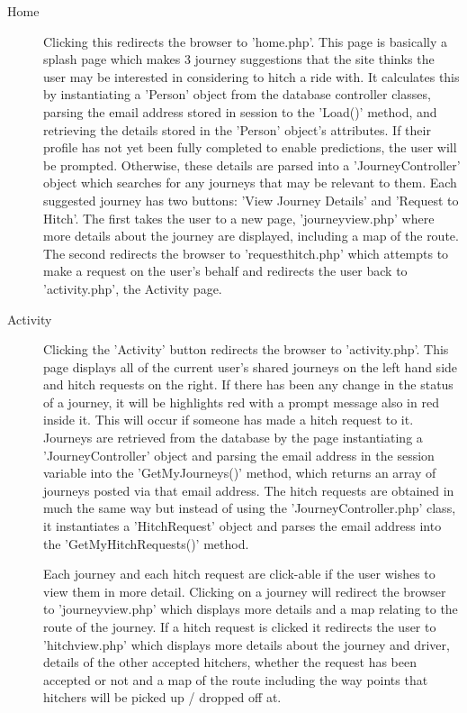 		\begin{description}
		\item[Home] Clicking this redirects the browser to 'home.php'. This page is basically a splash page which makes 3 journey suggestions that the site thinks the user may be interested in considering to hitch a ride with. It calculates this by instantiating a 'Person' object from the database controller classes, parsing the email address stored in session to the 'Load()' method, and retrieving the details stored in the 'Person' object's attributes. If their profile has not yet been fully completed to enable predictions, the user will be prompted. Otherwise, these details are parsed into a 'Journey\textunderscore Controller' object which searches for any journeys that may be relevant to them. Each suggested journey has two buttons: 'View Journey Details' and 'Request to Hitch'. The first takes the user to a new page, 'journey\textunderscore view.php' where more details about the journey are displayed, including a map of the route. The second redirects the browser to 'request\textunderscore hitch.php' which attempts to make a request on the user's behalf and redirects the user back to 'activity.php', the Activity page.
		\item[Activity] Clicking the 'Activity' button redirects the browser to 'activity.php'. This page displays all of the current user's shared journeys on the left hand side and hitch requests on the right. If there has been any change in the status of a journey, it will be highlights red with a prompt message also in red inside it. This will occur if someone has made a hitch request to it. Journeys are retrieved from the database by the page instantiating a 'Journey\textunderscore Controller' object and parsing the email address in the session variable into the 'GetMyJourneys()' method, which returns an array of journeys posted via that email address. The hitch requests are obtained in much the same way but instead of using the 'Journey\textunderscore Controller.php' class, it instantiates a 'Hitch\textunderscore Request' object and parses the email address into the 'GetMyHitchRequests()' method. 
		
		Each journey and each hitch request are click-able if the user wishes to view them in more detail. Clicking on a journey will redirect the browser to 'journey\textunderscore view.php' which displays more details and a map relating to the route of the journey. If a hitch request is clicked it redirects the user to 'hitch\textunderscore view.php' which displays more details about the journey and driver, details of the other accepted hitchers, whether the request has been accepted or not and a map of the route including the way points that hitchers will be picked up / dropped off at.


\end{description}

